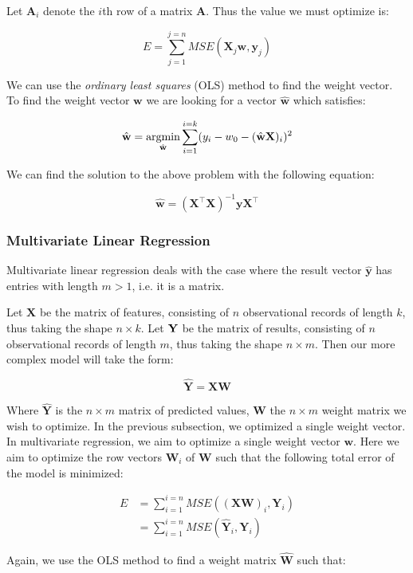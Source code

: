 \documentclass[a4paper,english]{article}
\newcommand{\argmin}{\operatornamewithlimits{argmin}}
\begin{document}
Let $\textbf{A}_i$ denote the $i$th row of a matrix $\textbf{A}$. Thus the value we must optimize is:

$$
E = \sum_{j=1}^{j=n}MSE(\textbf{X}_j \textbf{w}, \textbf{y}_j )
$$

We can use the \textit{ordinary least squares} (OLS) method to find the weight vector. To find the weight vector $\textbf{w}$ we are looking for a vector $\hat{\textbf{w}}$ which satisfies:

$$
\hat{\textbf{w}} = \argmin_{ \hat{\textbf{w}}} \sum_{i=1}^{i=k} (y_i - w_0 - (\hat{\textbf{w}}\textbf{X})_i)^2 
$$

We can find the solution to the above problem with the following equation:

$$
\hat{\textbf{w}} = (\textbf{X}^{\intercal}\textbf{X})^{-1}\textbf{y}\textbf{X}^{\intercal}
$$

\subsubsection{Multivariate Linear Regression}

Multivariate linear regression deals with the case where the result vector $\hat{\textbf{y}}$ has entries with length $m > 1$, i.e. it is a matrix.

Let $\textbf{X}$ be the matrix of features, consisting of $n$ observational records of length $k$, thus taking the shape $n \times k$. Let $\bold{Y}$ be the matrix of results, consisting of $n$ observational records of length $m$, thus taking the shape $n \times m$. Then our more complex model will take the form:

$$
\hat{\textbf{Y}} = \textbf{X} \textbf{W}
$$

Where $\hat{\textbf{Y}}$ is the $n \times m$ matrix of predicted values, $\textbf{W}$ the $n \times m$ weight matrix we wish to optimize. In the previous subsection, we optimized a single weight vector. In multivariate regression, we aim to optimize a single weight vector $\textbf{w}$. Here we aim to optimize the row vectors $\textbf{W}_{i}$ of $\textbf{W}$ such that the following total error of the model is minimized:

\begin{align*}
E &= \sum_{i=1}^{i=n} MSE((\textbf{XW})_i, \textbf{Y}_{i}) \\
  &= \sum_{i=1}^{i=n} MSE(\hat{\textbf{Y}}_i, \textbf{Y}_{i})
\end{align*}
 
Again, we use the OLS method to find a weight matrix $\hat{\textbf{W}}$ such that:
\end{document}
